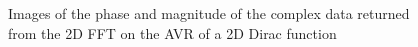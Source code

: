 \begin{figure}
\caption{Images of the phase and magnitude of the complex data returned from the 2D FFT on the AVR of a 2D Dirac function}
\label{fig:AVR:FFT2:Dirac}
\end{figure}

